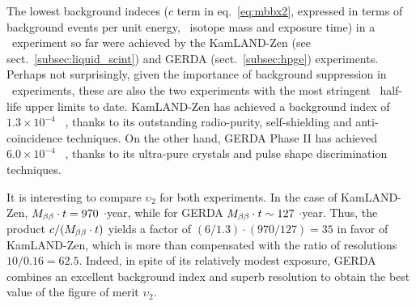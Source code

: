 The lowest background indeces ($c$ term in eq.~\ref{eq:mbbx2}, expressed in terms of background events per unit energy, \bb\ isotope mass and exposure time) in a \bbonu\ experiment so far were achieved by the KamLAND-Zen (see sect.~\ref{subsec:liquid_scint}) and GERDA (sect.~\ref{subsec:hpge}) experiments. Perhaps not surprisingly, given the importance of background suppression in \bbonu\ experiments, these are also the two experiments with the most stringent \bbonu\ half-life upper limits to date. KamLAND-Zen  has achieved a background index of $1.3\times 10^{-4}$ \ckkbby\ \cite{KamLAND-Zen:2022tow}, thanks to its outstanding radio-purity, self-shielding and anti-coincidence techniques. On the other hand, GERDA Phase II has achieved $6.0\times 10^{-4}$ \ckkbby\ \cite{GERDA:2020xhi}, thanks to its ultra-pure crystals and pulse shape discrimination techniques. 

It is interesting to compare $\upsilon_2$ for both experiments. In the case of KamLAND-Zen, $M_{\beta\beta}\cdot t = 970$ \kgbb$\cdot$year, while for GERDA 
$M_{\beta\beta}\cdot t \sim 127$ \kgbb$\cdot$year. Thus, the product $c/(M_{\beta\beta}\cdot t)$ yields a factor of 
$(6/1.3) \cdot (970/127) = 35$ in favor of KamLAND-Zen, which is more than compensated with the ratio of resolutions $10/0.16 = 62.5$. Indeed, in spite of its relatively modest exposure, GERDA combines an excellent background index and superb resolution to obtain the best value of the figure of merit $\upsilon_2$. 





